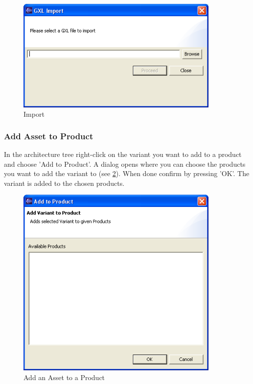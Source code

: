 \begin{figure}[h!]
\begin{center}
\includegraphics[width=10cm]{import.png}
   \caption{Import}
\label{import}
\end{center}
\end{figure}\par



\subsubsection{Add Asset to Product}
In the architecture tree right-click on the variant you want to add to a product
and choose 'Add to Product'. A dialog opens where you can choose the products you
want to add the variant to (see \ref{addproduct}). When done confirm by pressing
'OK'. The variant is added to the chosen products.


\begin{figure}[h!]
\begin{center}
\includegraphics[width=10cm]{addtoproduct.png}
   \caption{Add an Asset to a Product}
\label{addproduct}
\end{center}
\end{figure}\par


